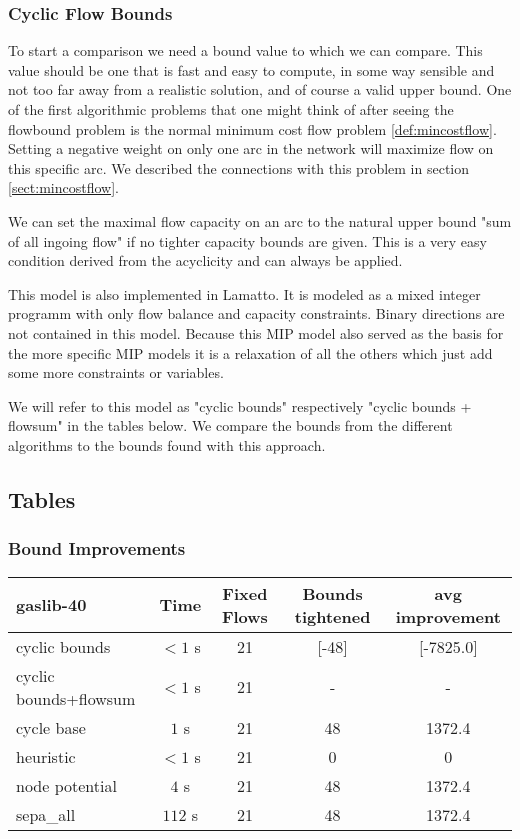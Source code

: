 \subsubsection{Cyclic Flow Bounds}%
\label{model:cyclicFlow}
To start a comparison we need a bound value to which we can compare. This value should be one that is fast and 
easy to compute, in some way sensible and not too far away from a realistic solution, and of course a valid upper 
bound. 
One of the first algorithmic problems that one might think of after seeing the flowbound problem is the normal minimum 
cost flow problem \ref{def:mincostflow}. Setting a negative weight on only one arc in the network will 
maximize flow on this specific arc. We described the connections with this problem in section \ref{sect:mincostflow}. 

We can set the maximal flow capacity on an arc to the natural upper bound "sum of all ingoing flow" if no tighter 
capacity bounds are given. This is a very easy condition derived from the acyclicity and can always be applied.

This model is also implemented in Lamatto. It is modeled as a mixed integer programm with only flow balance and 
capacity constraints. Binary directions are not contained in this model. Because this MIP model also served as the 
basis for the more specific MIP models it is a relaxation of all the others which just add some more constraints or 
variables.

We will refer to this model as "cyclic bounds" respectively "cyclic bounds + flowsum" in the tables below. We compare 
the bounds from the different algorithms to the bounds found with this approach. 


\subsection{Tables}
\subsubsection{Bound Improvements}
\begin{center}

\begin{tabular}{ l | c | c | c | c }
\textbf{gaslib-40} & Time  & Fixed Flows & Bounds tightened & avg improvement\\
\hline
 cyclic bounds& $<1$ s& 21 & [-48] & [-7825.0] \\
 cyclic bounds+flowsum& $<1$ s& 21 & - & - \\
 cycle base& $1$ s & 21 & 48 & 1372.4\\
 heuristic& $<1$ s& 21& 0 & 0\\
 node potential& $4$ s& 21 & 48 & 1372.4 \\ 
 sepa\_all& $112$ s& 21 & 48 & 1372.4\\
\end{tabular} 
\end{center}

